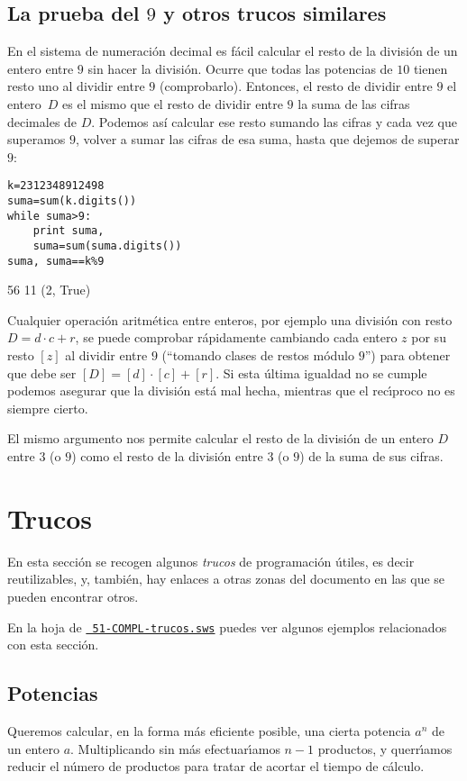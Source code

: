 \subsection{La prueba del $9$ y otros trucos similares}


En el sistema de numeraci\'on decimal es f\'acil calcular el resto de la
divisi\'on de un entero entre $9$ sin hacer la división. Ocurre que todas las
potencias de $10$
tienen resto uno al dividir entre $9$ (comprobarlo). Entonces, el resto de
dividir entre $9$ el entero~$D$ es el mismo que el resto de
dividir entre $9$ la suma de las cifras decimales de $D$. Podemos así calcular
ese
resto sumando las cifras y cada vez que superamos $9$, volver a sumar las cifras
de esa suma, hasta que dejemos de superar $9$:
\begin{lstlisting}
k=2312348912498
suma=sum(k.digits())
while suma>9:
    print suma,
    suma=sum(suma.digits())
suma, suma==k%9
\end{lstlisting}
\begin{Output}
	56 11
	(2, True)
\end{Output}

Cualquier operaci\'on aritm\'etica entre enteros, por ejemplo una divisi\'on con
resto $D=d\cdot c+r$,  se puede comprobar r\'apidamente cambiando cada entero
$z$ por su resto $[z]$  al dividir entre $9$ (``tomando clases de restos
m\'odulo $9$'') para obtener que debe ser $[D]=[d]\cdot [c]+[r].$ Si esta
\'ultima igualdad no se cumple podemos asegurar que la divisi\'on est\'a mal
hecha, mientras que el rec\'{\i}proco no es siempre cierto.


El mismo argumento nos permite calcular el resto de la divisi\'on de un entero
$D$ entre $3$ (o $9$) como el resto de la divisi\'on entre $3$ (o $9$) de la
suma de sus cifras.


\section{Trucos}

En esta secci\'on se recogen algunos {\itshape trucos} de programaci\'on
\'utiles, es decir reutilizables,  y, tambi\'en, hay  enlaces a otras zonas del
documento en las
que se pueden encontrar otros. 

En la hoja de {\sage} \href{http://sage.mat.uam.es:8888/home/pub/8/}{\tt
51-COMPL-trucos.sws} puedes ver algunos ejemplos relacionados con esta
secci\'on.



\subsection{Potencias} \label{potencias}
Queremos calcular, en la forma m\'as eficiente posible, una cierta  potencia
$a^n$  de un entero $a$. Multiplicando sin m\'as efec\-tua\-r\'{\i}amos $n-1$
productos, y querr\'{\i}amos reducir el n\'umero de productos para tratar de
acortar el tiempo de c\'alculo.



